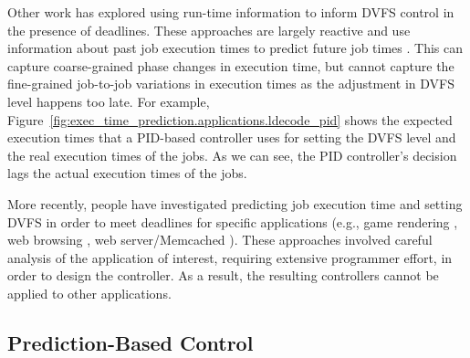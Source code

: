 Other work has explored using run-time information to inform DVFS control in
the presence of deadlines. These approaches are largely reactive and use
information about past job execution times to predict future job times
\cite{gu-dac08, choi-iccad02, pegasus-isca14, nachiappan-hpca15}. This can
capture coarse-grained phase changes in execution time, but cannot capture the
fine-grained job-to-job variations in execution times as the adjustment in DVFS
level happens too late.  For example,
Figure~\ref{fig:exec_time_prediction.applications.ldecode_pid} shows the
expected execution times that a PID-based controller uses for setting the DVFS
level and the real execution times of the jobs. As we can see, the PID
controller's decision lags the actual execution times of the jobs.

More recently, people have investigated predicting job execution time and
setting DVFS in order to meet deadlines for specific applications (e.g., game
rendering \cite{gu-rtas08}, web browsing \cite{zhu-hpca13, eqos-hpca15}, web
server/Memcached \cite{adrenaline-hpca15}). These approaches involved careful
analysis of the application of interest, requiring extensive programmer effort,
in order to design the controller. As a result, the resulting controllers
cannot be applied to other applications.

\subsection{Prediction-Based Control}

